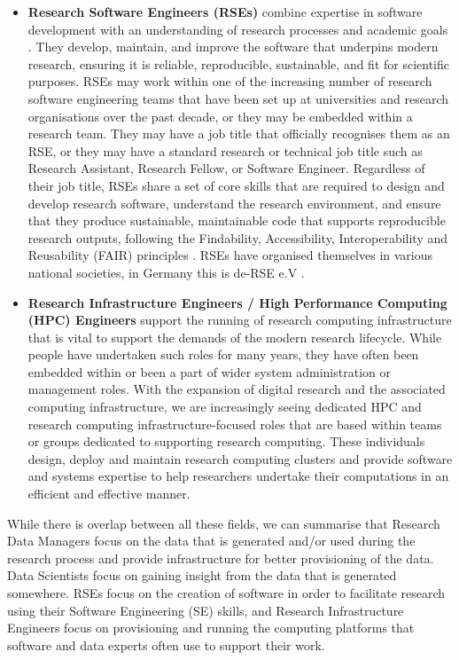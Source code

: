 \documentclass[
        english,biblatex
    ]{lni}
\begin{document}
    \begin{itemize}
    \item
      \textbf{Research Software Engineers (RSEs)} combine expertise in
      software development with an understanding of research processes
      and academic goals \autocite{zenodo495360}. They develop,
      maintain, and improve the software that underpins modern research,
      ensuring it is reliable, reproducible, sustainable, and fit for
      scientific purposes. RSEs may work within one of the increasing
      number of research software engineering teams that have been set
      up at universities and research organisations over the past
      decade, or they may be embedded within a research team. They may
      have a job title that officially recognises them as an RSE, or
      they may have a standard research or technical job title such as
      Research Assistant, Research Fellow, or Software Engineer.
      Regardless of their job title, RSEs share a set of core skills
      that are required to design and develop research software,
      understand the research environment, and ensure that they produce
      sustainable, maintainable code that supports reproducible research
      outputs, following the Findability, Accessibility,
      Interoperability and Reusability (FAIR) principles
      \autocite{Goth2024RSE}. RSEs have organised themselves in various
      national societies, in Germany this is de-RSE e.V
      \autocite{derseev}.
    \item
      \textbf{Research Infrastructure Engineers / High Performance
      Computing (HPC) Engineers} support the running of research
      computing infrastructure that is vital to support the demands of
      the modern research lifecycle. While people have undertaken such
      roles for many years, they have often been embedded within or been
      a part of wider system administration or management roles. With
      the expansion of digital research and the associated computing
      infrastructure, we are increasingly seeing dedicated HPC and
      research computing infrastructure-focused roles that are based
      within teams or groups dedicated to supporting research computing.
      These individuals design, deploy and maintain research computing
      clusters and provide software and systems expertise to help
      researchers undertake their computations in an efficient and
      effective manner.
    \end{itemize}

    While there is overlap between all these fields, we can summarise
    that Research Data Managers focus on the data that is generated
    and/or used during the research process and provide infrastructure
    for better provisioning of the data. Data Scientists focus on
    gaining insight from the data that is generated somewhere. RSEs
    focus on the creation of software in order to facilitate research
    using their Software Engineering (SE) skills, and Research
    Infrastructure Engineers focus on provisioning and running the
    computing platforms that software and data experts often use to
    support their work.
\end{document}

